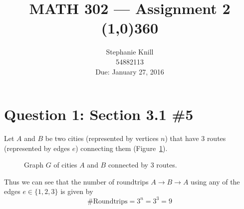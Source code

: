 \documentclass[11pt, oneside]{article}   	%
\begin{document}
\title{MATH 302 --- Assignment 2 \\
\line(1,0){360} \\              %
\vspace{0.2cm}}
\author{
Stephanie Knill \\
54882113 \\
Due: January 27, 2016}

\date{}                   %
\maketitle

\thispagestyle{empty}                   %



\section*{Question 1: Section 3.1 \#5}

Let $A$ and $B$ be two cities (represented by vertices $n$) that have 3 routes (represented by edges $e$) connecting them
(Figure~\ref{2 cities}).

\begin{figure}[h]
\centering


\caption{Graph $G$ of cities $A$ and $B$ connected by 3 routes.}
\label{2 cities}
\end{figure}

Thus we can see that the number of roundtrips $A \rightarrow B \rightarrow A$ using any of the edges $e \in \{1,2,3\}$ is given by 
$$\text{\# Roundtrips} = 3^n = 3^3 = 9$$
\end{document}
